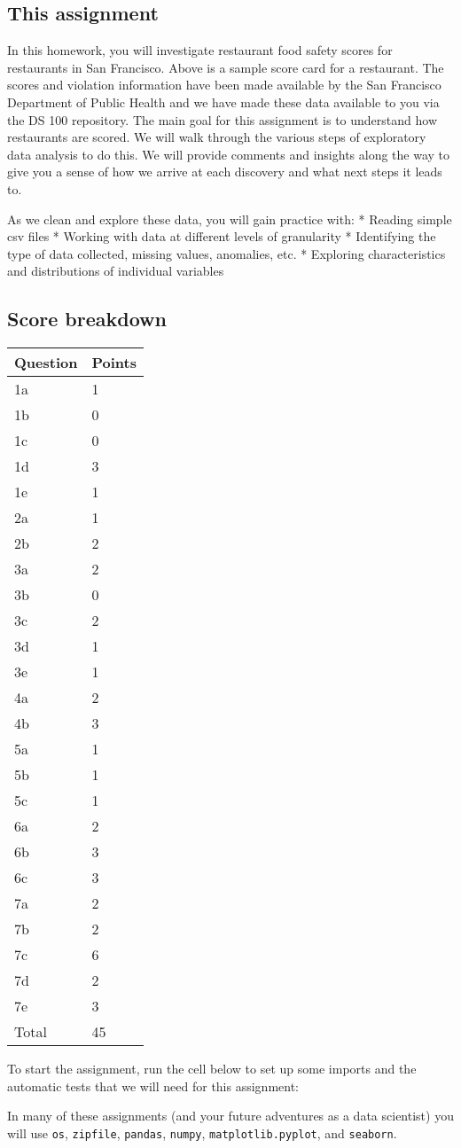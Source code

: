 \documentclass[11pt]{article}
\begin{document}
\subsection{This assignment}\label{this-assignment}

In this homework, you will investigate restaurant food safety scores for
restaurants in San Francisco. Above is a sample score card for a
restaurant. The scores and violation information have been made
available by the San Francisco Department of Public Health and we have
made these data available to you via the DS 100 repository. The main
goal for this assignment is to understand how restaurants are scored. We
will walk through the various steps of exploratory data analysis to do
this. We will provide comments and insights along the way to give you a
sense of how we arrive at each discovery and what next steps it leads
to.

As we clean and explore these data, you will gain practice with: *
Reading simple csv files * Working with data at different levels of
granularity * Identifying the type of data collected, missing values,
anomalies, etc. * Exploring characteristics and distributions of
individual variables

\subsection{Score breakdown}\label{score-breakdown}

\begin{longtable}[]{@{}ll@{}}
\toprule
Question & Points\tabularnewline
\midrule
\endhead
1a & 1\tabularnewline
1b & 0\tabularnewline
1c & 0\tabularnewline
1d & 3\tabularnewline
1e & 1\tabularnewline
2a & 1\tabularnewline
2b & 2\tabularnewline
3a & 2\tabularnewline
3b & 0\tabularnewline
3c & 2\tabularnewline
3d & 1\tabularnewline
3e & 1\tabularnewline
4a & 2\tabularnewline
4b & 3\tabularnewline
5a & 1\tabularnewline
5b & 1\tabularnewline
5c & 1\tabularnewline
6a & 2\tabularnewline
6b & 3\tabularnewline
6c & 3\tabularnewline
7a & 2\tabularnewline
7b & 2\tabularnewline
7c & 6\tabularnewline
7d & 2\tabularnewline
7e & 3\tabularnewline
Total & 45\tabularnewline
\bottomrule
\end{longtable}

    To start the assignment, run the cell below to set up some imports and
the automatic tests that we will need for this assignment:

In many of these assignments (and your future adventures as a data
scientist) you will use \texttt{os}, \texttt{zipfile}, \texttt{pandas},
\texttt{numpy}, \texttt{matplotlib.pyplot}, and \texttt{seaborn}.
\end{document}
